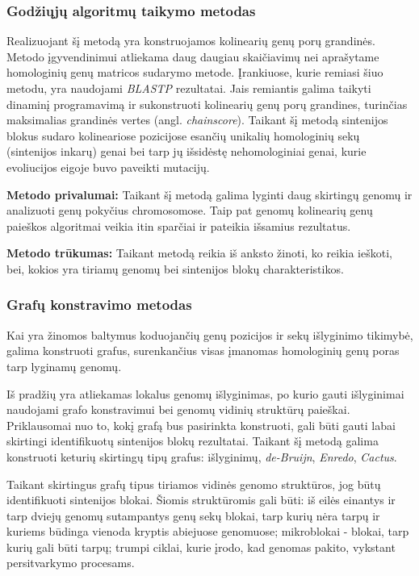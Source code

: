 \documentclass[12pt]{article}
\begin{document}
\subsubsection*{Godžiųjų algoritmų taikymo metodas}
Realizuojant šį metodą\cite{ARTICLE2} yra konstruojamos kolinearių genų porų
grandinės. Metodo į\-gy\-ven\-di\-ni\-mui atliekama daug daugiau skaičiavimų
nei aprašytame homologinių genų matricos sudarymo metode. Įrankiuose, kurie
remiasi šiuo metodu, yra naudojami \emph{BLASTP}\cite{BLASTP} rezultatai. Jais
remiantis galima taikyti dinaminį programavimą ir sukonstruoti kolinearių genų
porų grandines, turinčias maksimalias grandinės vertes
(angl. \emph{chainscore}). Taikant šį metodą sintenijos blokus sudaro
kolineariose pozicijose esančių unikalių homologinių sekų (sintenijos inkarų)
genai bei tarp jų išsidėstę nehomologiniai genai, kurie evoliucijos eigoje buvo
paveikti mutacijų.

\textbf{Metodo privalumai:} Taikant šį metodą galima lyginti daug skirtingų
genomų ir analizuoti genų pokyčius chromosomose. Taip pat genomų kolinearių
genų paieškos algoritmai veikia itin sparčiai ir pateikia išsamius rezultatus.

\textbf{Metodo trūkumas:} Taikant metodą reikia iš anksto žinoti, ko reikia
ieškoti, bei, kokios yra tiriamų genomų bei sintenijos blokų charakteristikos.

\subsubsection*{Grafų konstravimo metodas}
Kai yra žinomos baltymus koduojančių genų pozicijos ir sekų išlyginimo tikimybė,
galima konstruoti grafus, surenkančius visas įmanomas homologinių genų poras
tarp lyginamų genomų\cite{ARTICLE2}.

Iš pradžių yra atliekamas lokalus genomų išlyginimas, po kurio gauti išlyginimai
naudojami grafo konstravimui bei genomų vidinių struktūrų paieškai. Priklausomai
nuo to, kokį grafą bus pasirinkta konstruoti, gali būti gauti labai skirtingi
identifikuotų sintenijos blokų rezultatai. Taikant šį metodą galima konstruoti
keturių skirtingų tipų grafus: išlyginimų, \emph{de-Bruijn}\cite{DEBRUIJN},
\emph{Enredo}\cite{ENREDO}, \emph{Cactus}\cite{CACTUS}.

Taikant skirtingus grafų tipus tiriamos vidinės genomo struktūros, jog būtų
identifikuoti sintenijos blokai. Šiomis struktūromis gali būti: iš eilės
einantys ir tarp dviejų genomų sutampantys genų sekų blokai, tarp kurių nėra
tarpų ir kuriems būdinga vienoda kryptis abiejuose genomuose; mikroblokai -
blokai, tarp kurių gali būti tarpų; trumpi ciklai, kurie įrodo, kad genomas
pakito, vykstant persitvarkymo procesams\cite{ARTICLE2}.
\end{document}
